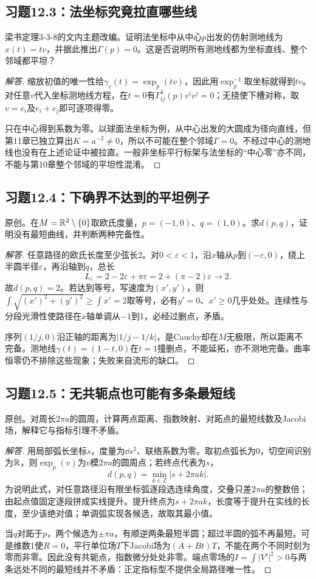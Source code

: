 \subsection*{习题12.3：法坐标究竟拉直哪些线}
梁书定理3-3-8的文内主题改编。证明法坐标中从中心$p$出发的仿射测地线为$x(t)=tv$，并据此推出$\Gamma(p)=0$。这是否说明所有测地线都为坐标直线、整个邻域都平坦？
\begin{proof}[解答]
缩放初值的唯一性给$\gamma_v(t)=\exp_p(tv)$，因此用$\exp_p^{-1}$取坐标就得到$tv$。对任意$v$代入坐标测地线方程，在$t=0$有$\Gamma^k_{ij}(p)v^iv^j=0$；无挠使下槽对称，取$v=e_i$及$e_i+e_j$即可逐项得零。

只在中心得到系数为零。以球面法坐标为例，从中心出发的大圆成为径向直线，但第11章已独立算出$K=a^{-2}\ne0$，所以不可能在整个邻域$\Gamma=0$。不经过中心的测地线也没有在上述论证中被拉直。一般非坐标平行标架与法坐标的“中心零”亦不同，不能与第10章整个邻域的平坦性混淆。
\end{proof}

\subsection*{习题12.4：下确界不达到的平坦例子}
原创。在$M=\mathbb{R}^2\setminus\{0\}$取欧氏度量，$p=(-1,0)$、$q=(1,0)$。求$d(p,q)$，证明没有最短曲线，并判断两种完备性。
\begin{proof}[解答]
任意路径的欧氏长度至少弦长2。对$0<\varepsilon<1$，沿$x$轴从$p$到$(-\varepsilon,0)$，绕上半圆半径$\varepsilon$，再沿轴到$q$，总长
\[
 L_\varepsilon=2-2\varepsilon+\pi\varepsilon
 =2+(\pi-2)\varepsilon\longrightarrow2.
\]
故$d(p,q)=2$。若达到等号，写速度为$(x',y')$，则$\int\sqrt{(x')^2+(y')^2}\geq\int x'=2$取等号，必有$y'=0$、$x'\geq0$几乎处处。连续性与分段光滑性使路径在$x$轴单调从$-1$到1，必经过删点，矛盾。

序列$(1/j,0)$沿正轴的距离为$|1/j-1/k|$，是Cauchy却在$M$无极限，所以距离不完备。测地线$\gamma(t)=(1-t,0)$在$t=1$撞删点，不能延拓，亦不测地完备。曲率恒零仍不排除这些现象；失败来自流形的缺口。
\end{proof}

\subsection*{习题12.5：无共轭点也可能有多条最短线}
原创。对周长$2\pi a$的圆周，计算两点距离、指数映射、对跖点的最短线数及Jacobi场，解释它与指标引理不矛盾。
\begin{proof}[解答]
用局部弧长坐标$s$，度量为$\dd s^2$、联络系数为零。取初点弧长为0，切空间识别为$\mathbb{R}$，则$\exp_p(v)$为$v$模$2\pi a$的圆周点；若终点代表为$s$，
\[
 d(p,q)=\min_{k\in\mathbb Z}|s+2\pi ak|.
\]
为说明此式，对任意路径沿有限坐标弧逐段选连续角度，交叠只差$2\pi a$的整数倍；由起点值固定逐段拼成实线提升。提升终点为$s+2\pi ak$，长度等于提升在实线的长度，至少该绝对值；单调弧实现各候选，故取其最小值。

当$q$对跖于$p$，两个候选为$\pm\pi a$，有顺逆两条最短半圆；超过半圆的弧不再最短。可是维数1使$R=0$，平行单位场$T$下Jacobi场为$(A+Bt)T$，不能在两个不同时刻为零而非零。因此没有共轭点，指数微分处处非零。端点零场的$I=\int|V'|^2>0$与两条远处不同的最短线并不矛盾：正定指标型不提供全局路径唯一性。
\end{proof}


